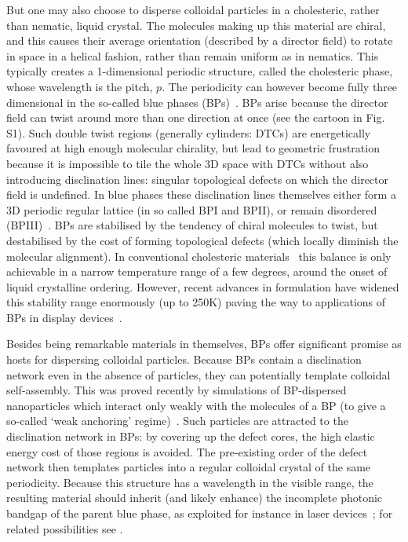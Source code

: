 \documentclass[12pt]{article}
\begin{document}
But one may also choose to disperse colloidal particles in a cholesteric, 
rather than nematic, liquid crystal. The molecules making up this material are
chiral, and this causes their average orientation (described by a director field) to rotate in space in
a helical fashion, rather than remain uniform as in nematics. 
This typically creates a 1-dimensional periodic structure, called the cholesteric phase, whose wavelength 
is the pitch, $p$. The periodicity can however become fully three dimensional in the so-called blue phases (BPs)~\cite{mermin}. BPs arise because the director field can twist around more than one direction at once (see 
the cartoon in Fig. S1). Such double twist 
regions (generally cylinders: DTCs) are energetically favoured at high enough molecular chirality, but
lead to geometric frustration because it is impossible to tile the whole 3D
space with DTCs without also introducing disclination lines: singular topological defects on which the director field is undefined. In blue phases these disclination lines themselves either form a 3D periodic regular lattice (in so called BPI and BPII), or remain disordered (BPIII)~\cite{bp3}. 
%
BPs are stabilised by the tendency of chiral molecules to twist, but destabilised by the cost of forming topological defects (which locally diminish the molecular alignment). In conventional cholesteric materials~\cite{mermin} this balance is only achievable in a narrow temperature range of a few degrees, around the onset of liquid crystalline ordering. However, recent advances in formulation have widened this stability range enormously (up to 250K) paving the way to
applications of BPs in display devices~\cite{kikuchi,coleswidetrange,bpdevice}.

Besides being remarkable materials in themselves, BPs offer significant promise as hosts for dispersing colloidal particles. Because BPs contain a disclination network even in the absence of
particles, they can potentially template colloidal self-assembly. 
This was proved recently by simulations of BP-dispersed nanoparticles which interact only weakly with the molecules of a BP (to give a so-called `weak anchoring' regime)~\cite{miha}. Such particles are attracted to the disclination network in BPs: by covering up the defect cores, the high elastic energy cost of those regions is avoided. The pre-existing order of the defect network then templates particles into a regular colloidal crystal of the same periodicity. 
Because this structure has a wavelength in the visible range, 
the resulting material should inherit (and likely enhance) the incomplete photonic bandgap of the parent blue phase, as exploited for instance in laser devices~\cite{bplasers}; for related possibilities see \cite{lavrentovich}.
\end{document}
